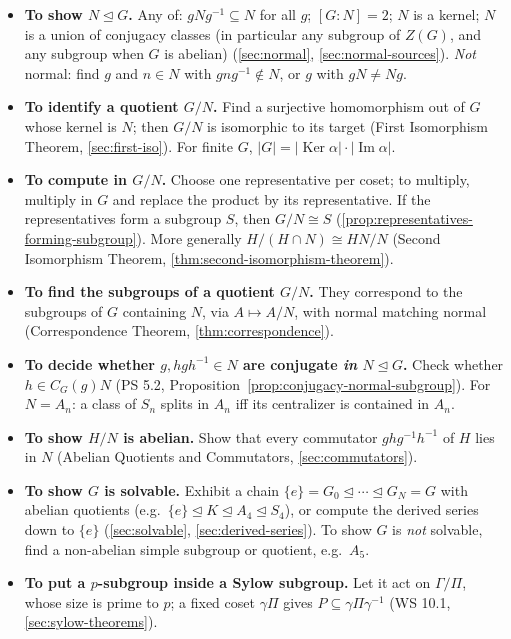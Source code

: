 \documentclass[11pt]{report}
\begin{document}
\begin{itemize}
    \item \textbf{To show $N \trianglelefteq G$.} Any of: $gNg^{-1} \subseteq N$ for all $g$; $[G : N] = 2$; $N$ is a kernel; $N$ is a union of conjugacy classes (in particular any subgroup of $Z(G)$, and any subgroup when $G$ is abelian) (\ref{sec:normal}, \ref{sec:normal-sources}). \emph{Not} normal: find $g$ and $n \in N$ with $gng^{-1} \notin N$, or $g$ with $gN \neq Ng$.
    \item \textbf{To identify a quotient $G/N$.} Find a surjective homomorphism out of $G$ whose kernel is $N$; then $G/N$ is isomorphic to its target (First Isomorphism Theorem, \ref{sec:first-iso}). For finite $G$, $|G| = |\operatorname{Ker}\alpha| \cdot |\operatorname{Im}\alpha|$.
    \item \textbf{To compute in $G/N$.} Choose one representative per coset; to multiply, multiply in $G$ and replace the product by its representative. If the representatives form a subgroup $S$, then $G/N \cong S$ (\ref{prop:representatives-forming-subgroup}). More generally $H/(H \cap N) \cong HN/N$ (Second Isomorphism Theorem, \ref{thm:second-isomorphism-theorem}).
    \item \textbf{To find the subgroups of a quotient $G/N$.} They correspond to the subgroups of $G$ containing $N$, via $A \mapsto A/N$, with normal matching normal (Correspondence Theorem, \ref{thm:correspondence}).
    \item \textbf{To decide whether $g, hgh^{-1} \in N$ are conjugate \emph{in} $N \trianglelefteq G$.} Check whether $h \in C_G(g)N$ (PS 5.2, Proposition~\ref{prop:conjugacy-normal-subgroup}). For $N = A_n$: a class of $S_n$ splits in $A_n$ iff its centralizer is contained in $A_n$.
    \item \textbf{To show $H/N$ is abelian.} Show that every commutator $ghg^{-1}h^{-1}$ of $H$ lies in $N$ (Abelian Quotients and Commutators, \ref{sec:commutators}).
    \item \textbf{To show $G$ is solvable.} Exhibit a chain $\{e\} = G_0 \trianglelefteq \cdots \trianglelefteq G_N = G$ with abelian quotients (e.g.\ $\{e\} \trianglelefteq K \trianglelefteq A_4 \trianglelefteq S_4$), or compute the derived series down to $\{e\}$ (\ref{sec:solvable}, \ref{sec:derived-series}). To show $G$ is \emph{not} solvable, find a non-abelian simple subgroup or quotient, e.g.\ $A_5$.
    \item \textbf{To put a $p$-subgroup inside a Sylow subgroup.} Let it act on $\Gamma/\Pi$, whose size is prime to $p$; a fixed coset $\gamma\Pi$ gives $P \subseteq \gamma\Pi\gamma^{-1}$ (WS 10.1, \ref{sec:sylow-theorems}).

\end{itemize}
\end{document}

